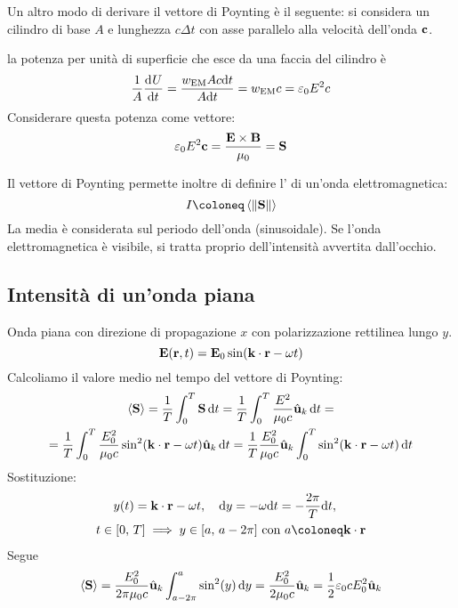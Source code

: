 Un altro modo di derivare il vettore di Poynting è il seguente: si considera un cilindro di base $A$ e lunghezza $c \Delta t$ con asse parallelo alla velocità dell'onda $\mathbf{c}$.

la potenza per unità di superficie che esce da una faccia del cilindro è
\begin{equation}
    \frac{1}{A} \der[U]{t} = \frac{w\EM A c \de t}{A \de t} = w\EM c = \eps_0 E^2 c
\end{equation}
Considerare questa potenza come vettore:
\begin{equation}
    \varepsilon_0 E^2 \mathbf{c} = \frac{\mathbf{E} \times \mathbf{B}}{\mu_0} = \mathbf{S}
\end{equation}

Il vettore di Poynting permette inoltre di definire l' di un'onda elettromagnetica:
\begin{equation}
    I \coloneq \avg{\norm{\poy}}
\end{equation}
La media è considerata sul periodo dell'onda (sinusoidale).
Se l'onda elettromagnetica è visibile, si tratta proprio dell'intensità avvertita dall'occhio.

\subsection{Intensità di un'onda piana}

Onda piana con direzione di propagazione $x$ con polarizzazione rettilinea lungo $y$.
\begin{equation}
    \mathbf{E}(\mathbf{r}, t) = \mathbf{E}_0 \sin(\mathbf{k} \cdot \mathbf{r} - \omega t)
\end{equation}
Calcoliamo il valore medio nel tempo del vettore di Poynting:
\begin{equation}
\begin{gathered}
    \left\langle \mathbf{S} \right\rangle = \frac{1}{T} \int_0^T \mathbf{S} \, \mathrm{d} t
    = \frac{1}{T} \int_0^T \frac{E^2}{\mu_0 c} \hat{\mathbf{u}}_{k} \, \mathrm{d} t = \\
    = \frac{1}{T} \int_0^T \frac{E_0^2}{\mu_0 c} \sin^2(\mathbf{k} \cdot \mathbf{r} - \omega t) \hat{\mathbf{u}}_{k} \, \mathrm{d} t
    = \frac{1}{T} \frac{E_0^2}{\mu_0 c} \hat{\mathbf{u}}_{k} \int_0^T \sin^2(\mathbf{k} \cdot \mathbf{r} - \omega t) \, \mathrm{d} t
\end{gathered}
\end{equation}
Sostituzione:
\begin{equation}
\begin{gathered}
    y(t) = \vt{k} \cdot \p - \omega t, \quad
    \de y = -\omega \de t = -\frac{2 \pi}{T} \de t, \quad \\
    t \in [0, \, T] \implies y \in [a, \, a - 2\pi]
    \text{ con } a \coloneq \vt{k} \cdot \p
\end{gathered}
\end{equation}
Segue
\begin{gather}
    \left\langle \mathbf{S} \right\rangle = \frac{E_0^2}{2 \pi \mu_0 c} \hat{\mathbf{u}}_{k} \int_{a - 2\pi}^a \sin^2(y) \, \mathrm{d} y
    = \frac{E_0^2}{2 \mu_0 c} \hat{\mathbf{u}}_{k}
    = \frac{1}{2} \varepsilon_0 c E_0^2 \hat{\mathbf{u}}_{k}
\end{gather}

